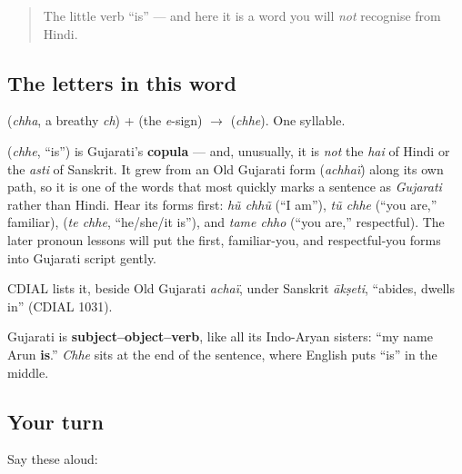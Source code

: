 \label{lesson:GU-C02-chhe}



\begin{quote}
The little verb \textquotedblleft{}is\textquotedblright{} — and here it is a word you will \emph{not} recognise from Hindi.
\end{quote}

\subsection*{The letters in this word}
\textbf{} (\emph{chha}, a breathy \emph{ch}) + \textbf{} (the \emph{e}-sign) $\to$ \textbf{} (\emph{chhe}). One syllable.

\begin{cousinweb}
\textbf{} (\emph{chhe}, \textquotedblleft{}is\textquotedblright{}) is Gujarati's \textbf{copula} — and, unusually, it is \emph{not} the \emph{hai} of Hindi or the \emph{asti} of Sanskrit. It grew from an Old Gujarati form (\emph{achhaï}) along its own path, so it is one of the words that most quickly marks a sentence as \emph{Gujarati} rather than Hindi. Hear its forms first: \emph{hũ chhũ} (\textquotedblleft{}I am\textquotedblright{}), \emph{tũ chhe} (\textquotedblleft{}you are,\textquotedblright{} familiar), \textbf{ } (\emph{te chhe}, \textquotedblleft{}he/she/it is\textquotedblright{}), and \emph{tame chho} (\textquotedblleft{}you are,\textquotedblright{} respectful). The later pronoun lessons will put the first, familiar-you, and respectful-you forms into Gujarati script gently.

CDIAL lists it, beside Old Gujarati \emph{achaï}, under Sanskrit \emph{ākṣeti}, \textquotedblleft{}abides, dwells in\textquotedblright{} (CDIAL 1031).
\end{cousinweb}

\begin{grammarlens}[title={Grammar Lens: the verb goes last}]
Gujarati is \textbf{subject–object–verb}, like all its Indo-Aryan sisters: \textquotedblleft{}my name Arun \textbf{is}.\textquotedblright{} \emph{Chhe} sits at the end of the sentence, where English puts \textquotedblleft{}is\textquotedblright{} in the middle.
\end{grammarlens}

\subsection*{Your turn}
Say these aloud:

